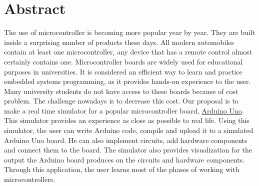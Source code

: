 \chapter*{Abstract}
\label{chap:abstract}

The use of microcontroller is becoming more popular year by year. They are built inside a surprising number of products these days. All modern automobiles contain at least one microcontroller, any device that has a remote control almost certainly contains one. Microcontroller boards are widely used for educational purposes in universities. It is considered an efficient way to learn and practice embedded systems programming, as it provides hands-on experience to the user. Many university students do not have access to these boards because of cost problem. The challenge nowadays is to decrease this cost. Our proposal is to make a real time simulator for a popular microcontroller board, \href{http://arduino.cc/en/Main/ArduinoBoardUno}{Arduino Uno}. This simulator provides an experience as close as possible to real life. Using this simulator, the user can write Arduino code, compile and upload it to a simulated Arduino Uno board. He can also implement circuits, add hardware components and connect them to the board. The simulator also provides visualization for the output the Arduino board produces on the circuits and hardware components. Through this application, the user learns most of the phases of working with microcontrollers.

